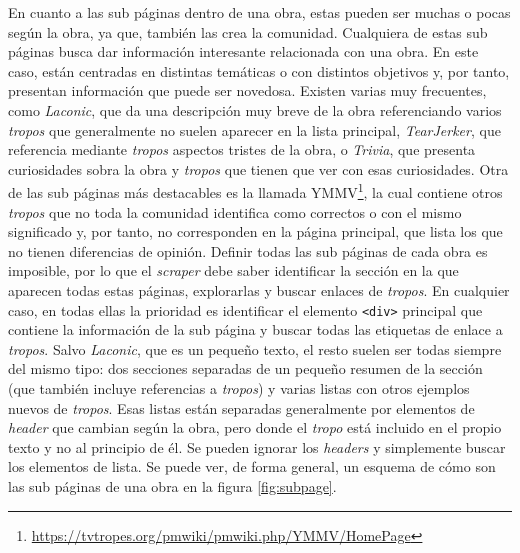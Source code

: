 En cuanto a las sub páginas dentro de una obra, estas pueden ser muchas o pocas
según la obra, ya que, también las crea la comunidad. Cualquiera de estas sub
páginas busca dar información interesante relacionada con una obra. En este
caso, están centradas en distintas temáticas o con distintos objetivos y, por
tanto, presentan información que puede ser novedosa. Existen varias muy
frecuentes, como \textit{Laconic}, que da una descripción muy breve de la obra
referenciando varios \textit{tropos} que generalmente no suelen aparecer en la
lista principal, \textit{TearJerker}, que referencia mediante \textit{tropos}
aspectos tristes de la obra, o \textit{Trivia}, que presenta curiosidades sobra
la obra y \textit{tropos} que tienen que ver con esas curiosidades. Otra de las
sub páginas más destacables es la llamada
YMMV\footnote{\url{https://tvtropes.org/pmwiki/pmwiki.php/YMMV/HomePage}}, la
cual contiene otros \textit{tropos} que no toda la comunidad identifica como
correctos o con el mismo significado y, por tanto, no corresponden en la página
principal, que lista los que no tienen diferencias de opinión. Definir todas las
sub páginas de cada obra es imposible, por lo que el \textit{scraper} debe saber
identificar la sección en la que aparecen todas estas páginas, explorarlas y
buscar enlaces de \textit{tropos}. En cualquier caso, en todas ellas la
prioridad es identificar el elemento \texttt{<div>} principal que contiene la
información de la sub página y buscar todas las etiquetas de enlace a
\textit{tropos}. Salvo \textit{Laconic}, que es un pequeño texto, el resto
suelen ser todas siempre del mismo tipo: dos secciones separadas de un pequeño
resumen de la sección (que también incluye referencias a \textit{tropos}) y
varias listas con otros ejemplos nuevos de \textit{tropos}. Esas listas están
separadas generalmente por elementos de \textit{header} que cambian según la
obra, pero donde el \textit{tropo} está incluido en el propio texto y no al
principio de él. Se pueden ignorar los \textit{headers} y simplemente buscar los
elementos de lista. Se puede ver, de forma general, un esquema de cómo son las
sub páginas de una obra en la figura \ref{fig:subpage}.

